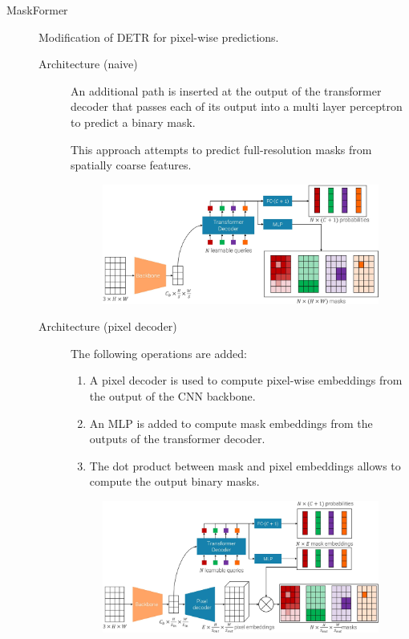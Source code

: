 \begin{description}
    \item[MaskFormer] 
        Modification of DETR for pixel-wise predictions.

        \begin{description}
            \item[Architecture (naive)] 
                An additional path is inserted at the output of the transformer decoder that passes each of its output into a multi layer perceptron to predict a binary mask.

                \begin{remark}
                    This approach attempts to predict full-resolution masks from spatially coarse features.
                \end{remark}

                \begin{figure}[H]
                    \centering
                    \includegraphics[width=0.75\linewidth]{./img/_maskformer_naive.jpg}
                \end{figure}

            \item[Architecture (pixel decoder)] 
                The following operations are added:
                \begin{enumerate}
                    \item A pixel decoder is used to compute pixel-wise embeddings from the output of the CNN backbone.
                    \item An MLP is added to compute mask embeddings from the outputs of the transformer decoder.
                    \item The dot product between mask and pixel embeddings allows to compute the output binary masks.
                \end{enumerate}

                \begin{figure}[H]
                    \centering
                    \includegraphics[width=0.75\linewidth]{./img/_maskformer_decoder.jpg}
                \end{figure}


\end{description}
\end{description}
